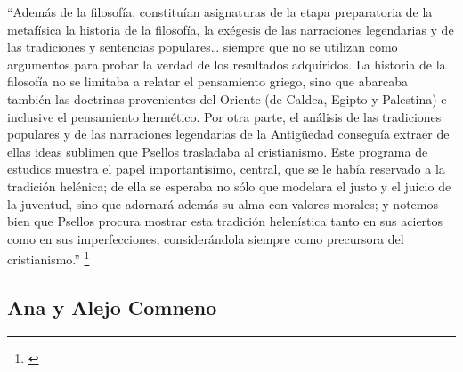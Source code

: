 “Además de la filosofía, constituían asignaturas de la etapa 
preparatoria de la metafísica la historia de la filosofía, 
la exégesis de las narraciones legendarias y de las tradiciones 
y sentencias populares… siempre que no se utilizan como argumentos 
para probar la verdad de los resultados adquiridos. 
La historia de la filosofía no se limitaba  a relatar el pensamiento 
griego, sino que abarcaba también las doctrinas provenientes del 
Oriente (de Caldea, Egipto y Palestina) e inclusive el pensamiento 
hermético. 
Por otra parte, el análisis de las tradiciones populares y de las 
narraciones legendarias de la Antigüedad conseguía extraer de ellas 
ideas sublimen que Psellos trasladaba al cristianismo. 
Este programa de estudios muestra el papel importantísimo, central, 
que se le había reservado a la tradición helénica; 
de ella se esperaba no sólo que modelara el justo y el juicio de la 
juventud, sino que adornará además su alma con valores morales; 
y notemos bien que Psellos procura mostrar esta tradición helenística 
tanto en sus aciertos como en sus imperfecciones, 
considerándola siempre como precursora del cristianismo.”
\footnote{\cite[p.~165]{filosofia}}

\subsection{Ana y Alejo Comneno}



